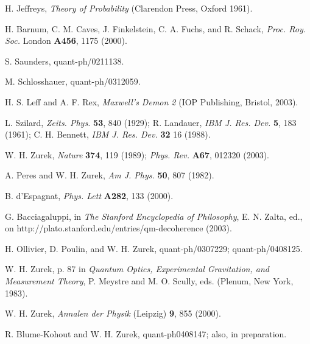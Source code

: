 \documentclass[aps,twocolumn,pra,epsfig]{revtex4}
\begin{document}
\noindent[50] H. Jeffreys, {\it Theory of Probability} 
(Clarendon Press, Oxford 1961).

\noindent[51] H. Barnum, C. M. Caves, J. Finkelstein, C. A. Fuchs, and 
R. Schack, {\it Proc. Roy. Soc.} London {\bf A456}, 1175 (2000).
 
\noindent[52] S. Saunders, quant-ph/0211138.

\noindent[53] M. Schlosshauer, quant-ph/0312059.

\noindent[54] H. S. Leff and A. F. Rex, {\it Maxwell's Demon 2} 
(IOP Publishing, Bristol, 2003).

\noindent[55] L. Szilard, {\it Zeits. Phys.} {\bf 53}, 840 (1929);
R. Landauer, {\it IBM J. Res. Dev.} {\bf 5}, 183 (1961);
C. H. Bennett, {\it IBM J. Res. Dev.} {\bf 32} 16 (1988). 

\noindent[56] W. H. Zurek,  {\it Nature} {\bf 374}, 119 (1989);
{\it Phys. Rev.} {\bf A67}, 012320 (2003).

\noindent[57] A. Peres and W. H. Zurek, {\it Am J. Phys.} {\bf 50}, 807 (1982).

\noindent[58] B. d'Espagnat, {\it Phys. Lett} {\bf A282}, 133 (2000).

\noindent[59] G. Bacciagaluppi, in {\it The Stanford Encyclopedia 
of Philosophy}, E. N. Zalta, ed., 
on http://plato.stanford.edu/entries/qm-decoherence (2003).

\noindent[60] H. Ollivier, D. Poulin, and W. H. Zurek, quant-ph/0307229;
quant-ph/0408125.

\noindent[61] W. H. Zurek, p. 87 in {\it Quantum Optics, Experimental 
Gravitation, and Measurement Theory}, P. Meystre and M. O. Scully, eds.
(Plenum, New York, 1983).

\noindent[62] W. H. Zurek, {\it Annalen der Physik} 
(Leipzig) {\bf 9}, 855 (2000).

\noindent[63] R. Blume-Kohout and W. H. Zurek, quant-ph0408147; also, 
in preparation. 
\end{document}

